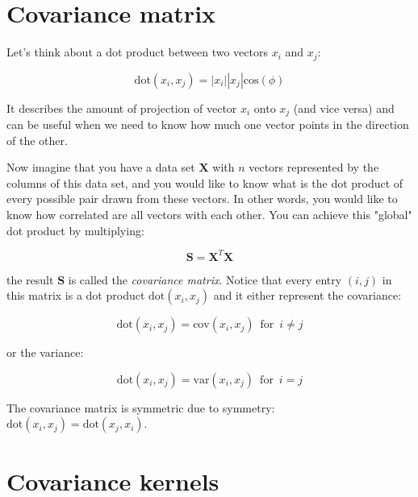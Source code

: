 \documentclass[10pt,twocolumn]{article}
\begin{document}


\section{Covariance matrix}

Let's think about a dot product between two vectors $x_i$ and $x_j$:

\begin{equation}
\text{dot}(x_i, x_j) = |x_i| |x_j| \text{cos}(\phi)
\end{equation}

It describes the amount of projection of vector $x_i$ onto $x_j$ (and vice versa) and can be useful when we need to know how much one vector points in the direction of the other.

Now imagine that you have a data set $\mathbf{X}$ with $n$ vectors represented by the columns of this data set, and you would like to know what is the dot product of every possible pair drawn from these vectors. In other words, you would like to know how correlated are all vectors with each other. You can achieve this "global" dot product by multiplying:

\begin{equation}\label{eq:covariance-matrix}
\mathbf{S} = \mathbf{X}^T \mathbf{X} 
\end{equation}

the result $\mathbf{S}$ is called the \textit{covariance matrix}. Notice that every entry $(i,j)$ in this matrix is a dot product $\text{dot}(x_i, x_j)$ and it either represent the covariance:

\begin{equation}
\text{dot}(x_i, x_j) = \text{cov}(x_i, x_j) \,\,\, \text{for} \,\,\, i \neq j
\end{equation}

or the variance:

\begin{equation}
\text{dot}(x_i, x_j) = \text{var}(x_i, x_j) \,\,\, \text{for} \,\,\, i = j
\end{equation}

The covariance matrix is symmetric due to symmetry: $\text{dot}(x_i, x_j) = \text{dot}(x_j, x_i)$.

\section{Covariance kernels}
\end{document}
